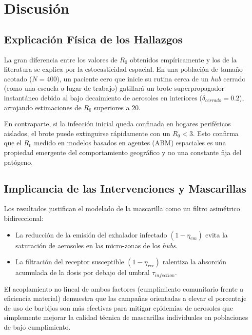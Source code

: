 \documentclass[conference]{IEEEtran}
\begin{document}
\section{Discusión}

\subsection{Explicación Física de los Hallazgos}
La gran diferencia entre los valores de $R_0$ obtenidos empíricamente y los de la literatura se explica por la estocasticidad espacial. En una población de tamaño acotado ($N = 400$), un paciente cero que inicie su rutina cerca de un \textit{hub} cerrado (como una escuela o lugar de trabajo) gatillará un brote superpropagador instantáneo debido al bajo decaimiento de aerosoles en interiores ($\delta_{cerrado} = 0.2$), arrojando estimaciones de $R_0$ superiores a $20$. 

En contraparte, si la infección inicial queda confinada en hogares periféricos aislados, el brote puede extinguirse rápidamente con un $R_0 < 3$. Esto confirma que el $R_0$ medido en modelos basados en agentes (ABM) espaciales es una propiedad emergente del comportamiento geográfico y no una constante fija del patógeno.

\subsection{Implicancia de las Intervenciones y Mascarillas}
Los resultados justifican el modelado de la mascarilla como un filtro asimétrico bidireccional:
\begin{itemize}
    \item La reducción de la emisión del exhalador infectado $(1 - \eta_{em})$ evita la saturación de aerosoles en las micro-zonas de los \textit{hubs}.
    \item La filtración del receptor susceptible $(1 - \eta_{rec})$ ralentiza la absorción acumulada de la dosis por debajo del umbral $\tau_{infection}$.
\end{itemize}

El acoplamiento no lineal de ambos factores (cumplimiento comunitario frente a eficiencia material) demuestra que las campañas orientadas a elevar el porcentaje de uso de barbijos son más efectivas para mitigar epidemias de aerosoles que simplemente mejorar la calidad técnica de mascarillas individuales en poblaciones de bajo cumplimiento.
\end{document}
